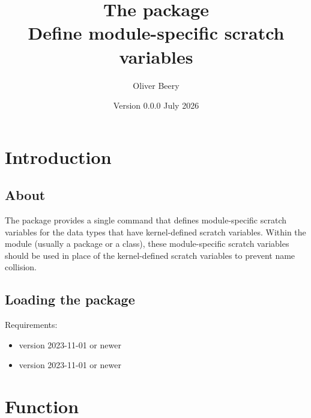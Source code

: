 \documentclass{l3doc}
\title{The \pkg{scratchvar} package \\
Define module-specific \pkg{expl3} scratch variables}
\author{Oliver Beery}
\date{Version 0.0.0\quad 21 July 2026}
\begin{document}
\maketitle


\section{Introduction}

\subsection{About}

The  package provides a single command
 that defines module-specific  scratch
variables for the  data types that have kernel-defined scratch
variables.
Within the module (usually a package or a class), these module-specific
scratch variables should be used in place of the kernel-defined scratch
variables to prevent name collision.

\subsection{Loading the package}

Requirements:
\begin{itemize}
  \item \LaTeXe{} version 2023-11-01 or newer
  \item {} version 2023-11-01 or newer
\end{itemize}


\section{Function}
\end{document}
